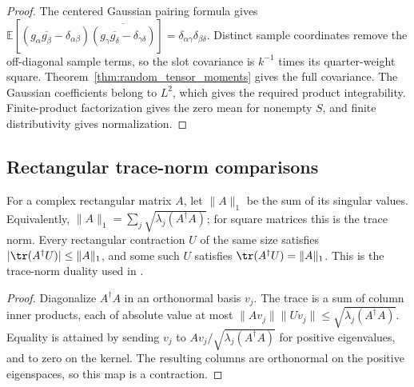 \begin{proof}\leanok
    The centered Gaussian pairing formula gives
    $\mathbb E[(g_\alpha\overline{g_\beta}-\delta_{\alpha\beta})
                \overline{(g_\gamma\overline{g_\delta}-\delta_{\gamma\delta})}]
        =\delta_{\alpha\gamma}\delta_{\beta\delta}$.
    Distinct sample coordinates remove the off-diagonal sample terms, so
    the slot covariance is $k^{-1}$ times its quarter-weight square.
    Theorem~\ref{thm:random_tensor_moments} gives the full covariance.
    The Gaussian coefficients belong to $L^2$, which gives the required
    product integrability. Finite-product factorization gives the zero
    mean for nonempty $S$, and finite distributivity gives normalization.
\end{proof}

\subsection{Rectangular trace-norm comparisons}

\begin{theorem}
    \label{thm:random_trace_duality}
    \leanok
    For a complex rectangular matrix $A$, let $\lVert A\rVert_1$ be the sum
    of its singular values. Equivalently,
    $\lVert A\rVert_1=\sum_j\sqrt{\lambda_j(A^\dagger A)}$; for square
    matrices this is the trace norm. Every rectangular contraction $U$
    of the same size satisfies
    $|\tr(A^\dagger U)|\leq\lVert A\rVert_1$, and some such $U$ satisfies
    $\tr(A^\dagger U)=\lVert A\rVert_1$.
    This is the trace-norm duality used in
    \cite[Equation~(5.13)]{OpenAI2026PolynomialPEPS}.
\end{theorem}

\begin{proof}\leanok
    Diagonalize $A^\dagger A$ in an orthonormal basis $v_j$.
    The trace is a sum of column inner products, each of absolute value at
    most $\lVert Av_j\rVert\lVert Uv_j\rVert
        \leq\sqrt{\lambda_j(A^\dagger A)}$.
    Equality is attained by sending $v_j$ to
    $Av_j/\sqrt{\lambda_j(A^\dagger A)}$ for positive eigenvalues, and to
    zero on the kernel. The resulting columns are orthonormal on the
    positive eigenspaces, so this map is a contraction.
\end{proof}

